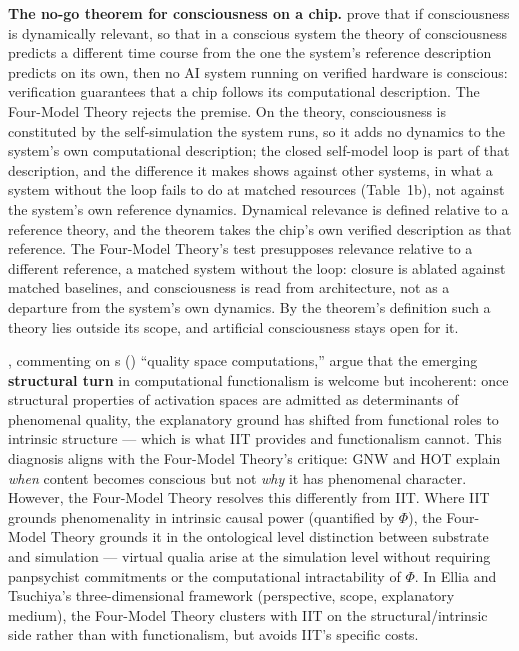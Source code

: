 \documentclass[12pt]{article}
\begin{document}
\textbf{The no-go theorem for consciousness on a chip.} \citet{KleinerLudwig2024nogo} prove that if consciousness is dynamically relevant, so that in a conscious system the theory of consciousness predicts a different time course from the one the system's reference description predicts on its own, then no AI system running on verified hardware is conscious: verification guarantees that a chip follows its computational description. The Four-Model Theory rejects the premise. On the theory, consciousness is constituted by the self-simulation the system runs, so it adds no dynamics to the system's own computational description; the closed self-model loop is part of that description, and the difference it makes shows against other systems, in what a system without the loop fails to do at matched resources (Table~1b), not against the system's own reference dynamics. Dynamical relevance is defined relative to a reference theory, and the theorem takes the chip's own verified description as that reference. The Four-Model Theory's test presupposes relevance relative to a different reference, a matched system without the loop: closure is ablated against matched baselines, and consciousness is read from architecture, not as a departure from the system's own dynamics. By the theorem's definition such a theory lies outside its scope, and artificial consciousness stays open for it.

\citet{Ellia2025}, commenting on \citeauthor{Fleming2024}\textquotesingle s (\citeyear{Fleming2024}) ``quality space computations,'' argue that the emerging \textbf{structural turn} in computational functionalism is welcome but incoherent: once structural properties of activation spaces are admitted as determinants of phenomenal quality, the explanatory ground has shifted from functional roles to intrinsic structure --- which is what IIT provides and functionalism cannot. This diagnosis aligns with the Four-Model Theory's critique: GNW and HOT explain \emph{when} content becomes conscious but not \emph{why} it has phenomenal character. However, the Four-Model Theory resolves this differently from IIT. Where IIT grounds phenomenality in intrinsic causal power (quantified by $\Phi$), the Four-Model Theory grounds it in the ontological level distinction between substrate and simulation --- virtual qualia arise at the simulation level without requiring panpsychist commitments or the computational intractability of $\Phi$. In Ellia and Tsuchiya's three-dimensional framework (perspective, scope, explanatory medium), the Four-Model Theory clusters with IIT on the structural/intrinsic side rather than with functionalism, but avoids IIT's specific costs.
\end{document}
